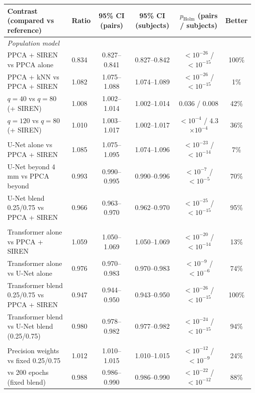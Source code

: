 \begin{tabular}{llcccc}
\toprule
Contrast (compared vs reference) & Ratio & 95\% CI (pairs) & 95\% CI (subjects) & $p_\mathrm{Holm}$ (pairs / subjects) & Better \\
\midrule
\multicolumn{6}{l}{\textit{Population model}} \\
\quad PPCA + SIREN vs PPCA alone & 0.834 & 0.827--0.841 & 0.827--0.842 & $<10^{-26}$ / $<10^{-15}$ & 100\% \\
\quad PPCA + kNN vs PPCA + SIREN & 1.082 & 1.075--1.088 & 1.074--1.089 & $<10^{-26}$ / $<10^{-15}$ & 1\% \\
\quad $q=40$ vs $q=80$ (+ SIREN) & 1.008 & 1.002--1.014 & 1.002--1.014 & 0.036 / 0.008 & 42\% \\
\quad $q=120$ vs $q=80$ (+ SIREN) & 1.010 & 1.003--1.017 & 1.002--1.017 & $<10^{-4}$ / 4.3$\times10^{-4}$ & 36\% \\
\addlinespace[2pt]
\multicolumn{6}{l}{\textit{Graph U-Net}} \\
\quad U-Net alone vs PPCA + SIREN & 1.085 & 1.075--1.095 & 1.074--1.096 & $<10^{-23}$ / $<10^{-14}$ & 7\% \\
\quad U-Net beyond 4\,mm vs PPCA beyond & 0.993 & 0.990--0.995 & 0.990--0.996 & $<10^{-7}$ / $<10^{-5}$ & 70\% \\
\quad U-Net blend 0.25/0.75 vs PPCA + SIREN & 0.966 & 0.963--0.970 & 0.962--0.970 & $<10^{-25}$ / $<10^{-15}$ & 95\% \\
\addlinespace[2pt]
\multicolumn{6}{l}{\textit{Transformer}} \\
\quad Transformer alone vs PPCA + SIREN & 1.059 & 1.050--1.069 & 1.050--1.069 & $<10^{-20}$ / $<10^{-14}$ & 13\% \\
\quad Transformer alone vs U-Net alone & 0.976 & 0.970--0.983 & 0.970--0.983 & $<10^{-9}$ / $<10^{-6}$ & 74\% \\
\quad Transformer blend 0.25/0.75 vs PPCA + SIREN & 0.947 & 0.944--0.950 & 0.943--0.950 & $<10^{-26}$ / $<10^{-15}$ & 100\% \\
\quad Transformer blend vs U-Net blend (0.25/0.75) & 0.980 & 0.978--0.982 & 0.977--0.982 & $<10^{-24}$ / $<10^{-15}$ & 94\% \\
\addlinespace[2pt]
\multicolumn{6}{l}{\textit{Blending}} \\
\quad Precision weights vs fixed 0.25/0.75 & 1.012 & 1.010--1.015 & 1.010--1.015 & $<10^{-12}$ / $<10^{-9}$ & 24\% \\
\quad 400 vs 200 epochs (fixed blend) & 0.988 & 0.986--0.990 & 0.986--0.990 & $<10^{-22}$ / $<10^{-12}$ & 88\% \\

\end{tabular}
